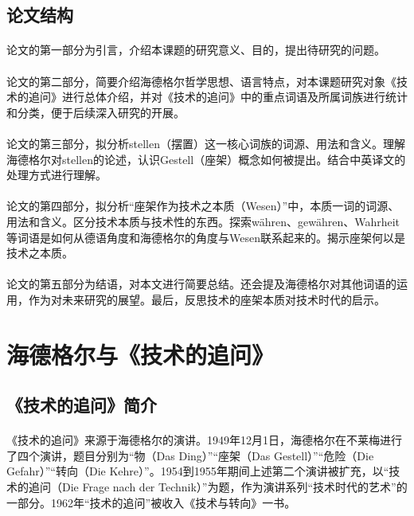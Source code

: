 \documentclass{article}
\begin{document}
	\subsection{论文结构}
		\paragraph{}
        论文的第一部分为引言，介绍本课题的研究意义、目的，提出待研究的问题。
		\paragraph{}
        论文的第二部分，简要介绍海德格尔哲学思想、语言特点，对本课题研究对象《技术的追问》进行总体介绍，并对《技术的追问》中的重点词语及所属词族进行统计和分类，便于后续深入研究的开展。
        \paragraph{}
        论文的第三部分，拟分析stellen（摆置）这一核心词族的词源、用法和含义。理解海德格尔对stellen的论述，认识Gestell（座架）概念如何被提出。结合中英译文的处理方式进行理解。
        \paragraph{}
        论文的第四部分，拟分析“座架作为技术之本质（Wesen）”中，本质一词的词源、用法和含义。区分技术本质与技术性的东西。探索währen、gewähren、Wahrheit等词语是如何从德语角度和海德格尔的角度与Wesen联系起来的。揭示座架何以是技术之本质。
        \paragraph{}
        论文的第五部分为结语，对本文进行简要总结。还会提及海德格尔对其他词语的运用，作为对未来研究的展望。最后，反思技术的座架本质对技术时代的启示。
\section{海德格尔与《技术的追问》} 
	\subsection{《技术的追问》简介}
		\paragraph{}
		《技术的追问》来源于海德格尔的演讲。1949年12月1日，海德格尔在不莱梅进行了四个演讲，题目分别为“物（Das Ding）”“座架（Das Gestell）”“危险（Die Gefahr）”“转向（Die Kehre）”。1954到1955年期间上述第二个演讲被扩充，以“技术的追问（Die Frage nach der Technik）”为题，作为演讲系列“技术时代的艺术”的一部分。1962年“技术的追问”被收入《技术与转向》一书。
\end{document}
